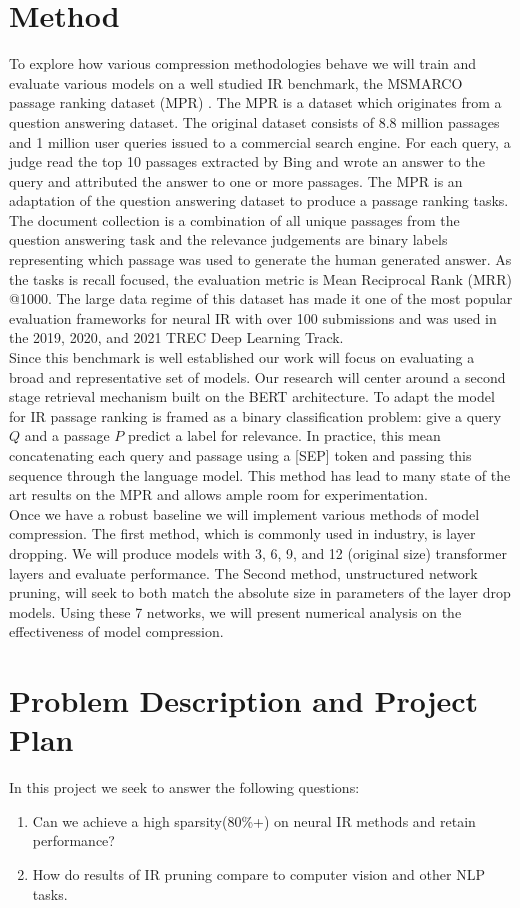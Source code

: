 \documentclass[sigplan,screen]{acmart}
\begin{document}
\section{Method}
To explore how various compression methodologies behave we will train and evaluate various models on a well studied IR benchmark, the MSMARCO passage ranking dataset (MPR) \cite{Campos2016MSMA}. The MPR is a dataset which originates from a question answering dataset. The original dataset consists of 8.8 million passages and 1 million user queries issued to a commercial search engine. For each query, a judge read the top 10 passages extracted by Bing and wrote an answer to the query and attributed the answer to one or more passages. The MPR is an adaptation of the question answering dataset to produce a passage ranking tasks. The document collection is a combination of all unique passages from the question answering task and the relevance judgements are binary labels representing which passage was used to generate the human generated answer. As the tasks is recall focused, the evaluation metric is Mean Reciprocal Rank (MRR) @1000. The large data regime of this dataset has made it one of the most popular evaluation frameworks for neural IR with over 100 submissions and was used in the 2019, 2020, and 2021 TREC Deep Learning Track. \\
Since this benchmark is well established our work will focus on evaluating a broad and representative set of models. Our research will center around a second stage retrieval mechanism built on the BERT \cite{Devlin2019BERTPO} architecture. To adapt the model for IR passage ranking is framed as a binary classification problem: give a query $Q$ and a passage $P$ predict a label for relevance. In practice, this mean concatenating each query and passage using a [SEP] token and passing this sequence through the language model. This method has lead to many state of the art results on the MPR and allows ample room for experimentation. \\
Once we have a robust baseline we will implement various methods of model compression. The first method, which is commonly used in industry, is layer dropping. We will produce models with 3, 6, 9, and 12 (original size) transformer layers and evaluate performance. The Second method, unstructured network pruning, will seek to both match the absolute size in parameters of the layer drop models. Using these 7 networks, we will present numerical analysis on the effectiveness of model compression. 
\section{Problem Description and Project Plan}
In this project we seek to answer the following questions: 
\begin{enumerate}
    \item Can we achieve a high sparsity(80\%+) on neural IR methods and retain performance?
    \item How do results of IR pruning compare to computer vision and other NLP tasks.
\end{enumerate}
\end{document}
